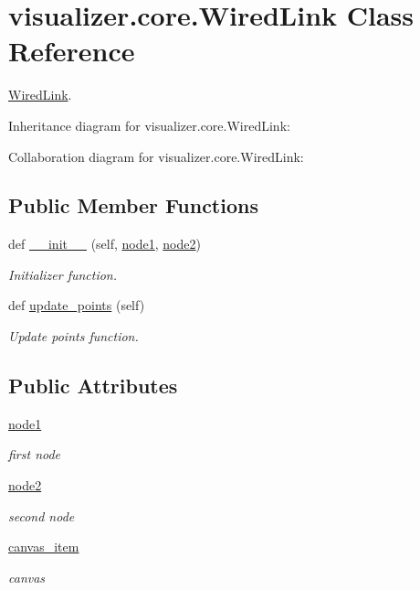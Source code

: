 \hypertarget{classvisualizer_1_1core_1_1WiredLink}{}\section{visualizer.\+core.\+Wired\+Link Class Reference}
\label{classvisualizer_1_1core_1_1WiredLink}


\hyperlink{classvisualizer_1_1core_1_1WiredLink}{Wired\+Link}.  




Inheritance diagram for visualizer.\+core.\+Wired\+Link\+:


Collaboration diagram for visualizer.\+core.\+Wired\+Link\+:
\subsection*{Public Member Functions}
\begin{DoxyCompactItemize}
\item 
def \hyperlink{classvisualizer_1_1core_1_1WiredLink_a2485cb458212ca69209a22ec0a0701b6}{\+\_\+\+\_\+init\+\_\+\+\_\+} (self, \hyperlink{classvisualizer_1_1core_1_1WiredLink_a60b0a98057fa7c53c67e74ab92facfb1}{node1}, \hyperlink{classvisualizer_1_1core_1_1WiredLink_abf9a99a21be943f7cea2c6516eb3d789}{node2})
\begin{DoxyCompactList}\small\item\em Initializer function. \end{DoxyCompactList}\item 
def \hyperlink{classvisualizer_1_1core_1_1WiredLink_a928ec793210f32d8d321eed7e5441fd2}{update\+\_\+points} (self)
\begin{DoxyCompactList}\small\item\em Update points function. \end{DoxyCompactList}\end{DoxyCompactItemize}
\subsection*{Public Attributes}
\begin{DoxyCompactItemize}
\item 
\hyperlink{classvisualizer_1_1core_1_1WiredLink_a60b0a98057fa7c53c67e74ab92facfb1}{node1}
\begin{DoxyCompactList}\small\item\em first node \end{DoxyCompactList}\item 
\hyperlink{classvisualizer_1_1core_1_1WiredLink_abf9a99a21be943f7cea2c6516eb3d789}{node2}
\begin{DoxyCompactList}\small\item\em second node \end{DoxyCompactList}\item 
\hyperlink{classvisualizer_1_1core_1_1WiredLink_a962e6a36b9efd542f3bd9087e08a365f}{canvas\+\_\+item}
\begin{DoxyCompactList}\small\item\em canvas \end{DoxyCompactList}\end{DoxyCompactItemize}


